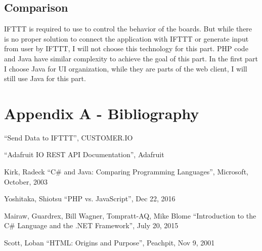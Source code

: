 \documentclass[10pt,onecolumn,journal,draftclsnofoot]{IEEEtran}
\begin{document}
    \subsection{Comparison}
    \par 
    IFTTT is required to use to control the behavior of the boards. But while there is no proper solution to connect the application with IFTTT or generate input from user by IFTTT, I will not choose this technology for this part. PHP code and Java have similar complexity to achieve the goal of this part. In the first part I choose Java for UI organization, while they are parts of the web client, I will still use Java for this part.
    
	\newpage
	\section{Appendix A - Bibliography}
	\par 
	[1] “Send Data to IFTTT”, CUSTOMER.IO
	\par
	[2] “Adafruit IO REST API Documentation”, Adafruit
	\par
	[3] Kirk, Radeck “C\# and Java: Comparing Programming Languages”, Microsoft, October, 2003
	\par
	[4] Yoshitaka, Shiotsu “PHP vs. JavaScript”, Dec 22, 2016
	\par
	[5] Mairaw, Guardrex, Bill Wagner, Tompratt-AQ, Mike Blome “Introduction to the C\# Language and the .NET Framework”, July 20, 2015
	\par
	[6] Scott, Loban “HTML: Origins and Purpose”, Peachpit, Nov 9, 2001
\end{document}

